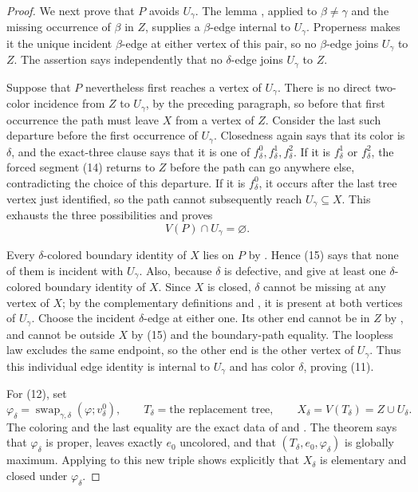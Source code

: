 \begin{proof}
We next prove that $P$ avoids $U_\gamma$.  The lemma
, applied to $\beta\ne\gamma$ and
the missing occurrence of $\beta$ in $Z$, supplies a $\beta$-edge
internal to $U_\gamma$.  Properness makes it the unique incident
$\beta$-edge at either vertex of this pair, so no $\beta$-edge joins
$U_\gamma$ to $Z$.  The assertion
 says independently that no
$\delta$-edge joins $U_\gamma$ to $Z$.

Suppose that $P$ nevertheless first reaches a vertex of $U_\gamma$.
There is no direct two-color incidence from $Z$ to $U_\gamma$, by the
preceding paragraph, so before that first occurrence the path must leave
$X$ from a vertex of $Z$.  Consider the last such departure before the
first occurrence of $U_\gamma$.  Closedness again says that its color is
$\delta$, and the exact-three clause says that it is one of
$f^0_\delta,f^1_\delta,f^2_\delta$.  If it is $f^1_\delta$ or
$f^2_\delta$, the forced segment (14) returns to $Z$ before the path can
go anywhere else, contradicting the choice of this departure.  If it is
$f^0_\delta$, it occurs after the last tree vertex just identified, so
the path cannot subsequently reach $U_\gamma\subseteq X$.  This exhausts
the three possibilities and proves
\[
 V(P)\cap U_\gamma=\varnothing. \tag{15}
\]

Every $\delta$-colored boundary identity of $X$ lies on $P$ by
.  Hence (15) says that none
of them is incident with $U_\gamma$.  Also, because $\delta$ is defective,
 and  give at least
one $\delta$-colored boundary identity of $X$.  Since $X$ is closed,
$\delta$ cannot be missing at any vertex of $X$; by the complementary
definitions  and , it is
present at both vertices of $U_\gamma$.  Choose the incident
$\delta$-edge at either one.  Its other end cannot be in $Z$ by
, and cannot be outside $X$ by (15) and
the boundary-path equality.  The loopless law excludes the same endpoint,
so the other end is the other vertex of $U_\gamma$.  Thus this individual
edge identity is internal to $U_\gamma$ and has color $\delta$, proving
(11).

For (12), set
\[
 \varphi_\delta=
 \operatorname{swap}_{\gamma,\delta}(\varphi;v^0_\delta),
 \qquad T_\delta=\text{the replacement tree},\qquad
 X_\delta=V(T_\delta)=Z\cup U_\delta.
\]
The coloring and the last equality are the exact data of
 and
.  The theorem
 says that $\varphi_\delta$ is proper,
leaves exactly $e_0$ uncolored, and that
$(T_\delta,e_0,\varphi_\delta)$ is globally maximum.  Applying
 to this new triple shows explicitly
that $X_\delta$ is elementary and closed under $\varphi_\delta$.


\end{proof}
